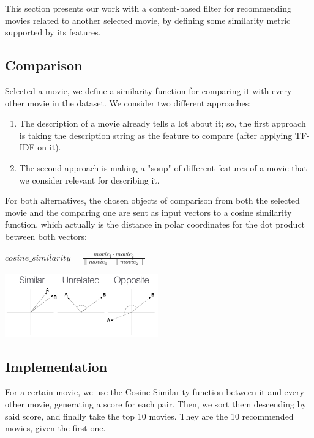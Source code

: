 This section presents our work with a content-based filter for
recommending movies related to another selected movie,
by defining some similarity metric supported by its features.

\subsection*{Comparison}
Selected a movie, we define a similarity function for comparing it with every other movie in the dataset.
We consider two different approaches:
\begin{enumerate}
    \item The description of a movie already tells a lot about it; so, the first approach is taking the description string as the feature to compare (after applying TF-IDF on it).
    \item The second approach is making a "soup" of different features of a movie that we consider relevant for describing it.
\end{enumerate}
For both alternatives, the chosen objects of comparison from both the selected movie and the comparing one are sent as input vectors to a cosine similarity function,
which actually is the distance in polar coordinates for the dot product between both vectors:

\begin{center}
    \( cosine\_similarity = 
        \frac{movie_1 \cdotp movie_2}{\lVert movie_1 \rVert \lVert movie_2 \rVert}
    \)\\
\end{center}

\begin{center}
    \captionsetup{type=figure}
    \includegraphics[width=250px]{images/cb-cos.png}
\end{center}

\subsection*{Implementation}
For a certain movie, we use the Cosine Similarity function between it and every other movie, generating a score for each pair.
Then, we sort them descending by said score, and finally take the top 10 movies. They are the 10 recommended movies, given the first one.
